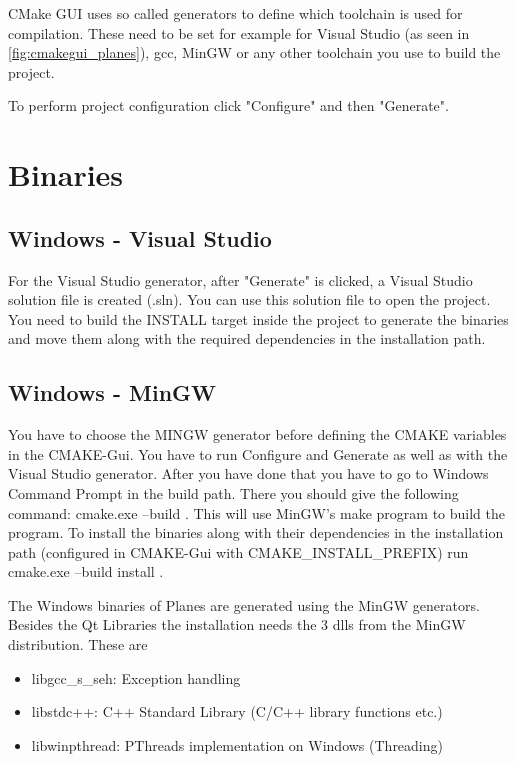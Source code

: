 CMake GUI uses so called generators to define which toolchain is used for compilation. These need to be set for example for Visual Studio (as seen in \ref{fig:cmakegui_planes}), gcc, MinGW or any other toolchain you use to build the project.

To perform project configuration click "Configure" and then "Generate".

\section {Binaries}

\subsection{Windows - Visual Studio}

For the Visual Studio generator, after "Generate" is clicked, a Visual Studio solution file is created (.sln). You can use this solution file to open the project. You need to build the INSTALL target inside the project to generate the binaries and move them along with the required dependencies in the installation path. 

\subsection {Windows - MinGW} 

You have to choose the MINGW generator before defining the CMAKE variables in the CMAKE-Gui. You have to run Configure and Generate as well as with the Visual Studio generator. After you have done that you have to go to Windows Command Prompt in the build path. There you should give the following command: cmake.exe --build . This will use MinGW's make program to build the program. To install the binaries along with their dependencies in the installation path (configured in CMAKE-Gui with CMAKE\_INSTALL\_PREFIX) run cmake.exe --build install .

The Windows binaries of Planes are generated using the MinGW generators. Besides the Qt Libraries the installation needs the 3 dlls from the MinGW distribution. These are

\begin{itemize}
	\item libgcc\_s\_seh: Exception handling
	\item libstdc++: C++ Standard Library (C/C++ library functions etc.)
	\item libwinpthread: PThreads implementation on Windows (Threading)
\end{itemize}

